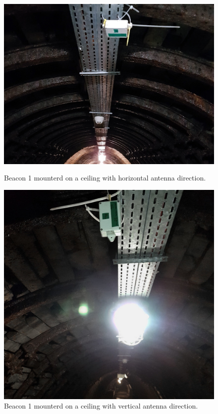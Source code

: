\documentclass[../main.tex]{subfiles}
\begin{document}
\begin{figure}[!htbp]
\begin{minipage}{0.49\linewidth}
\includegraphics[width=\textwidth, trim={3cm 0 3cm 0},clip]{pictures/tests_beacon_celing_horizontal.pdf}
\caption{Beacon 1 mounterd on a ceiling with horizontal antenna direction.}
\label{fig:tests_beacon_celing_horizontal}
\end{minipage}\hfill%
\begin{minipage}{0.49\linewidth}
\includegraphics[width=\textwidth, trim={0 1cm 0 0},clip]{pictures/tests_beacon_celing_vertical.pdf}
\caption{Beacon 1 mounterd on a ceiling with vertical antenna direction.}
\label{fig:tests_beacon_celing_vertical}
\end{minipage}
\end{figure}
\end{document}
